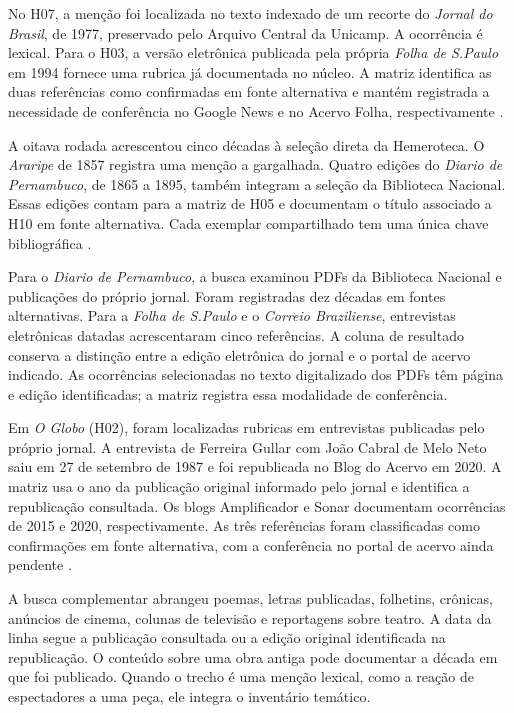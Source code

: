 No H07, a menção  foi localizada no texto indexado de um recorte do \textit{Jornal do Brasil}, de 1977, preservado pelo Arquivo Central da Unicamp. A ocorrência é lexical. Para o H03, a versão eletrônica publicada pela própria \textit{Folha de S.Paulo} em 1994 fornece uma rubrica já documentada no núcleo. A matriz identifica as duas referências como confirmadas em fonte alternativa e mantém registrada a necessidade de conferência no Google News e no Acervo Folha, respectivamente \cite{acervoD036,folha1994}.

A oitava rodada acrescentou cinco décadas à seleção direta da Hemeroteca. O \textit{Araripe} de 1857 registra uma menção a gargalhada. Quatro edições do \textit{Diario de Pernambuco}, de 1865 a 1895, também integram a seleção da Biblioteca Nacional. Essas edições contam para a matriz de H05 e documentam o título associado a H10 em fonte alternativa. Cada exemplar compartilhado tem uma única chave bibliográfica \cite{acervoD050,acervoD038,acervoD040,acervoD042,acervoD044}.

Para o \textit{Diario de Pernambuco}, a busca examinou PDFs da Biblioteca Nacional e publicações do próprio jornal. Foram registradas dez décadas em fontes alternativas. Para a \textit{Folha de S.Paulo} e o \textit{Correio Braziliense}, entrevistas eletrônicas datadas acrescentaram cinco referências. A coluna de resultado conserva a distinção entre a edição eletrônica do jornal e o portal de acervo indicado. As ocorrências selecionadas no texto digitalizado dos PDFs têm página e edição identificadas; a matriz registra essa modalidade de conferência.

Em \textit{O Globo} (H02), foram localizadas rubricas em entrevistas publicadas pelo próprio jornal. A entrevista de Ferreira Gullar com João Cabral de Melo Neto saiu em 27 de setembro de 1987 e foi republicada no Blog do Acervo em 2020. A matriz usa o ano da publicação original informado pelo jornal e identifica a republicação consultada. Os blogs Amplificador e Sonar documentam ocorrências de 2015 e 2020, respectivamente. As três referências foram classificadas como confirmações em fonte alternativa, com a conferência no portal de acervo ainda pendente \cite{acervoD058,acervoD059,acervoD060}.

A busca complementar abrangeu poemas, letras publicadas, folhetins, crônicas, anúncios de cinema, colunas de televisão e reportagens sobre teatro. A data da linha segue a publicação consultada ou a edição original identificada na republicação. O conteúdo sobre uma obra antiga pode documentar a década em que foi publicado. Quando o trecho é uma menção lexical, como a reação de espectadores a uma peça, ele integra o inventário temático.


